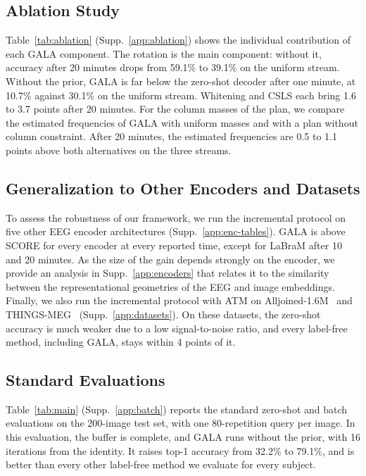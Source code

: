 \documentclass[10pt,twocolumn,letterpaper]{article}
\begin{document}
\subsection{Ablation Study}
\label{sec:ablation}

Table~\ref{tab:ablation} (Supp.~\ref{app:ablation}) shows the individual contribution of each GALA component. The rotation is the main component: without it, accuracy after 20 minutes drops from 59.1\% to 39.1\% on the uniform stream. Without the prior, GALA is far below the zero-shot decoder after one minute, at 10.7\% against 30.1\% on the uniform stream. Whitening and CSLS each bring 1.6 to 3.7 points after 20 minutes. For the column masses of the plan, we compare the estimated frequencies of GALA with uniform masses and with a plan without column constraint. After 20 minutes, the estimated frequencies are 0.5 to 1.1 points above both alternatives on the three streams. 

\subsection{Generalization to Other Encoders and Datasets}
\label{sec:encoders}

To assess the robustness of our framework, we run the incremental protocol on five other EEG encoder architectures (Supp.~\ref{app:enc-tables}). GALA is above SCORE for every encoder at every reported time, except for LaBraM after 10 and 20 minutes. As the size of the gain depends strongly on the encoder, we provide an analysis in Supp.~\ref{app:encoders} that relates it to the similarity between the representational geometries of the EEG and image embeddings. Finally, we also run the incremental protocol with ATM on Alljoined-1.6M~\cite{xu2025alljoined} and THINGS-MEG~\cite{hebart2023thingsdata} (Supp.~\ref{app:datasets}). On these datasets, the zero-shot accuracy is much weaker due to a low signal-to-noise ratio, and every label-free method, including GALA, stays within 4 points of it.

\subsection{Standard Evaluations}
\label{sec:conventional}


Table~\ref{tab:main} (Supp.~\ref{app:batch}) reports the standard zero-shot and batch evaluations on the 200-image test set, with one 80-repetition query per image. In this evaluation, the buffer is complete, and GALA runs without the prior, with 16 iterations from the identity. It raises top-1 accuracy from 32.2\% to 79.1\%, and is better than every other label-free method we evaluate for every subject.
\end{document}
